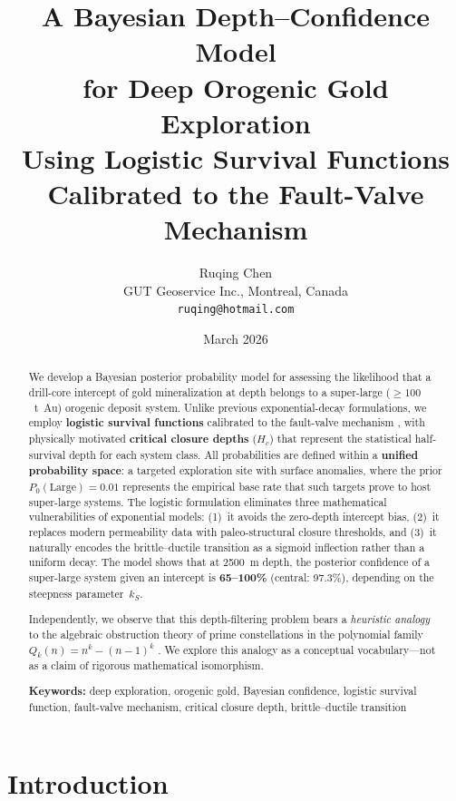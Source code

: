 \documentclass[11pt,a4paper]{article}
\title{\textbf{A Bayesian Depth--Confidence Model\\
for Deep Orogenic Gold Exploration}\\[6pt]
\large Using Logistic Survival Functions Calibrated to the Fault-Valve Mechanism}
\author{Ruqing Chen\\
\small GUT Geoservice Inc., Montreal, Canada\\
\small \texttt{ruqing@hotmail.com}}
\date{March 2026}
\begin{document}
\maketitle

\begin{abstract}
We develop a Bayesian posterior probability model for assessing the likelihood that a drill-core intercept of gold mineralization at depth belongs to a super-large ($\ge 100$~t~Au) orogenic deposit system.
Unlike previous exponential-decay formulations, we employ \textbf{logistic survival functions} calibrated to the fault-valve mechanism \cite{Sibson1988,Sibson2001}, with physically motivated \textbf{critical closure depths} ($H_c$) that represent the statistical half-survival depth for each system class.
All probabilities are defined within a \textbf{unified probability space}: a targeted exploration site with surface anomalies, where the prior $P_0(\text{Large}) = 0.01$ represents the empirical base rate that such targets prove to host super-large systems.
The logistic formulation eliminates three mathematical vulnerabilities of exponential models:
(1)~it avoids the zero-depth intercept bias,
(2)~it replaces modern permeability data with paleo-structural closure thresholds, and
(3)~it naturally encodes the brittle--ductile transition as a sigmoid inflection rather than a uniform decay.
The model shows that at 2500~m depth, the posterior confidence of a super-large system given an intercept is \textbf{65--100\%} (central: 97.3\%), depending on the steepness parameter~$k_S$.

Independently, we observe that this depth-filtering problem bears a \emph{heuristic analogy} to the algebraic obstruction theory of prime constellations in the polynomial family $Q_k(n) = n^k - (n-1)^k$ \cite{Chen2026a}.
We explore this analogy as a conceptual vocabulary---not as a claim of rigorous mathematical isomorphism.

\medskip
\noindent\textbf{Keywords:} deep exploration, orogenic gold, Bayesian confidence, logistic survival function, fault-valve mechanism, critical closure depth, brittle--ductile transition
\end{abstract}

\section{Introduction}
\end{document}
